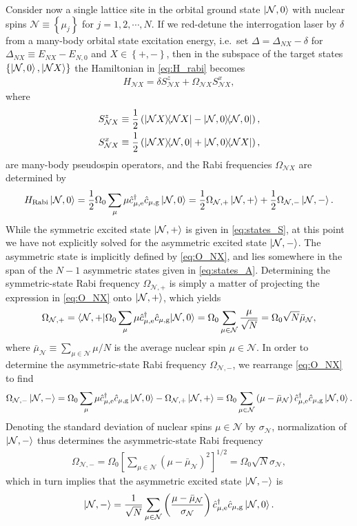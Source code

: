 \documentclass[preprint,showkeys,nofootinbib]{revtex4-1}
\renewcommand{\t}{\text} %
\newcommand{\f}{\dfrac} %
\newcommand{\p}[1]{\left(#1\right)} %
\renewcommand{\sp}[1]{\left[#1\right]} %
\renewcommand{\set}[1]{\left\{#1\right\}} %
\newcommand{\bk}{\braket} %
\newcommand{\g}{\text{g}}
\newcommand{\e}{\text{e}}
\renewcommand{\c}{\hat{c}}
\newcommand{\N}{\mathcal{N}}
\newcommand{\1}{\mathds{1}}
\begin{document}
Consider now a single lattice site in the orbital ground state
$\ket{\N,0}$ with nuclear spins $\N\equiv\set{\mu_j}$ for
$j=1,2,\cdots,N$.  If we red-detune the interrogation laser by
$\delta$ from a many-body orbital state excitation energy, i.e.~set
$\Delta=\Delta_{NX}-\delta$ for $\Delta_{NX}\equiv E_{NX}-E_{N,0}$ and
$X\in\set{+,-}$, then in the subspace of the target states
$\set{\ket{\N,0},\ket{\N X}}$ the Hamiltonian in \eqref{eq:H_rabi}
becomes
\begin{align}
  H_{\N X} = \delta S_{\N X}^z + \Omega_{\N X} S_{\N X}^x,
  \label{eq:H_NX}
\end{align}
where
\begin{align}
  S_{\N X}^z &\equiv \f12\p{\op{\N X}-\op{\N,0}},
  \label{eq:S_NX_z} \\
  S_{\N X}^x &\equiv \f12\p{\op{\N X}{\N,0}+\op{\N,0}{\N X}},
  \label{eq:S_NX_x}
\end{align}
are many-body pseudospin operators, and the Rabi frequencies
$\Omega_{\N X}$ are determined by
\begin{align}
  H_{\t{Rabi}}\ket{\N,0}
  = \f12\Omega_0\sum_\mu\mu\c_{\mu,\e}^\dag\c_{\mu,\g}\ket{\N,0}
  = \f12\Omega_{\N,+}\ket{\N,+} + \f12\Omega_{\N,-}\ket{\N,-}.
  \label{eq:O_NX}
\end{align}
While the symmetric excited state $\ket{\N,+}$ is given in
\eqref{eq:states_S}, at this point we have not explicitly solved for
the asymmetric excited state $\ket{\N,-}$.  The asymmetric state is
implicitly defined by \eqref{eq:O_NX}, and lies somewhere in the span
of the $N-1$ asymmetric states given in \eqref{eq:states_A}.
Determining the symmetric-state Rabi frequency $\Omega_{\N,+}$ is
simply a matter of projecting the expression in \eqref{eq:O_NX} onto
$\ket{\N,+}$, which yields
\begin{align}
  \Omega_{\N,+}
  = \bk{\N,+|\Omega_0\sum_\mu\mu\c_{\mu,\e}^\dag\c_{\mu,\g}|\N,0}
  = \Omega_0 \sum_{\mu\in\N} \f{\mu}{\sqrt{N}}
  = \Omega_0 \sqrt{N} \bar\mu_\N,
  \label{eq:O_N+}
\end{align}
where $\bar\mu_\N\equiv\sum_{\mu\in\N}\mu/N$ is the average nuclear
spin $\mu\in\N$.  In order to determine the asymmetric-state Rabi
frequency $\Omega_{\N,-}$, we rearrange \eqref{eq:O_NX} to find
\begin{align}
  \Omega_{\N,-}\ket{\N,-}
  = \Omega_0\sum_\mu\mu\c_{\mu,\e}^\dag\c_{\mu,\g}\ket{\N,0}
  - \Omega_{\N,+}\ket{\N,+}
  = \Omega_0 \sum_{\mu\in\N} \p{\mu - \bar\mu_\N}
  \c_{\mu,\e}^\dag \c_{\mu,\g} \ket{\N,0}.
\end{align}
Denoting the standard deviation of nuclear spins $\mu\in\N$ by
$\sigma_\N$, normalization of $\ket{\N,-}$ thus determines the
asymmetric-state Rabi frequency
\begin{align}
  \Omega_{\N,-}
  = \Omega_0 \sp{\sum_{\mu\in\N}\p{\mu-\bar\mu_\N}^2}^{1/2}
  = \Omega_0 \sqrt{N} \sigma_\N,
  \label{eq:O_N-}
\end{align}
which in turn implies that the asymmetric excited state $\ket{\N,-}$
is
\begin{align}
  \ket{\N,-} = \f1{\sqrt{N}}\sum_{\mu\in\N}
  \p{\f{\mu-\bar\mu_\N}{\sigma_\N}}
  \c_{\mu,\e}^\dag \c_{\mu,\g} \ket{\N,0}.
\end{align}
\end{document}
